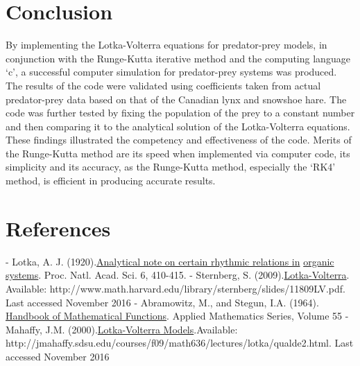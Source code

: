 \documentclass[11pt]{elsarticle}
\begin{document}
\section*{Conclusion}
By implementing the Lotka-Volterra equations for predator-prey models, in conjunction with the Runge-Kutta iterative method and the computing language `c', a successful computer simulation for predator-prey systems was produced. The results of the code were validated using coefficients taken from actual predator-prey data based on that of the Canadian lynx and snowshoe hare. The code was further tested by fixing the population of the prey to a constant number and then comparing it to the analytical solution of the Lotka-Volterra equations. These findings illustrated the competency and effectiveness of the code. Merits of the Runge-Kutta method are its speed when implemented via computer code, its simplicity and its accuracy, as the Runge-Kutta method, especially the ‘RK4’ method, is efficient in producing accurate results.



\newpage

\section*{References}

\noindent
\sloppy
[1] - Lotka, A. J. (1920).\underline{Analytical note on certain rhythmic relations in}
\newline
\underline{ organic systems}. Proc. Natl. Acad. Sci. 6, 410-415.
\newline
\newline
\noindent
\sloppy
[2] - Sternberg, S. (2009).\underline{Lotka-Volterra}. Available: http://www.math.harvard.edu/library/sternberg/slides/11809LV.pdf. Last accessed November 2016
\newline
\newline
\noindent
[3] - Abramowitz, M., and Stegun, I.A. (1964). \underline{Handbook of Mathematical Functions}. Applied Mathematics Series, Volume 55
\newline
\newline
\noindent
[4] - Mahaffy, J.M. (2000).\underline{Lotka-Volterra Models}.Available: http://jmahaffy.sdsu.edu/courses/f09/math636/lectures/lotka/qualde2.html. Last accessed November 2016
\newline
\newline
\noindent




\newpage
\appendix
\end{document}
